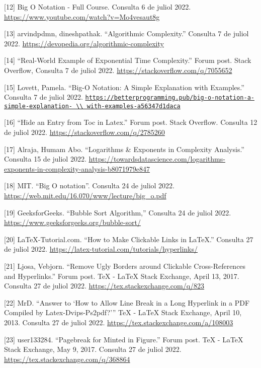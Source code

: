 [12] Big O Notation - Full Course. Consulta 6 de juliol 2022. \url{https://www.youtube.com/watch?v=Mo4vesaut8g}

[13] arvindpdmn, dineshpathak. “Algorithmic Complexity.” Consulta 7 de juliol 2022. \url{https://devopedia.org/algorithmic-complexity}

[14] “Real-World Example of Exponential Time Complexity.” Forum post. Stack Overflow, Consulta 7 de juliol 2022. \url{https://stackoverflow.com/q/7055652}

[15] Lovett, Pamela. “Big-O Notation: A Simple Explanation with Examples.” Consulta 7 de juliol 2022. \href{https://betterprogramming.pub/big-o-notation-a-simple-explanation-with-examples-a56347d1daca}{\nolinkurl{https://betterprogramming.pub/big-o-notation-a-simple-explanation- \\ with-examples-a56347d1daca}}

[16] “Hide an Entry from Toc in Latex.” Forum post. Stack Overflow. Consulta 12 de juliol 2022. \url{https://stackoverflow.com/q/2785260}

[17] Alraja, Humam Abo. “Logarithms \& Exponents in Complexity Analysis.” Consulta 15 de juliol 2022.
\href{https://towardsdatascience.com/logarithms-exponents-in-complexity-analysis-b8071979e847}{https://towardsdatascience.com/logarithms-exponents-in-complexity-analysis-b8071979e847}

[18] MIT. “Big O notation”.  Consulta 24 de juliol 2022. \url{https://web.mit.edu/16.070/www/lecture/big_o.pdf}

[19] GeeksforGeeks. “Bubble Sort Algorithm,” Consulta 24 de juliol 2022. \url{https://www.geeksforgeeks.org/bubble-sort/}

[20] LaTeX-Tutorial.com. “How to Make Clickable Links in LaTeX.” Consulta 27 de juliol 2022. \url{https://latex-tutorial.com/tutorials/hyperlinks/}

[21] Ljosa, Vebjorn. “Remove Ugly Borders around Clickable Cross-References and Hyperlinks.” Forum post. TeX - LaTeX Stack Exchange, April 13, 2017.  Consulta 27 de juliol 2022. \url{https://tex.stackexchange.com/q/823}

[22] MrD. “Answer to ‘How to Allow Line Break in a Long Hyperlink in a PDF Compiled by Latex-Dvips-Ps2pdf?’” TeX - LaTeX Stack Exchange, April 10, 2013. Consulta 27 de juliol 2022. \url{https://tex.stackexchange.com/a/108003}

[23] user133284. “Pagebreak for Minted in Figure.” Forum post. TeX - LaTeX Stack Exchange, May 9, 2017. Consulta 27 de juliol 2022.  \url{https://tex.stackexchange.com/q/368864}

